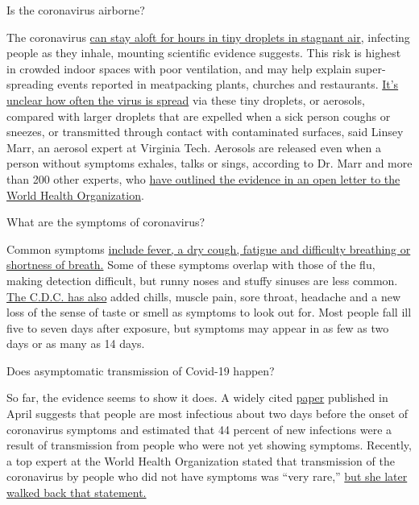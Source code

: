  Is the coronavirus airborne?

The coronavirus
\href{https://www.nytimes.com/2020/07/04/health/239-experts-with-one-big-claim-the-coronavirus-is-airborne.html}{can
stay aloft for hours in tiny droplets in stagnant air}, infecting people
as they inhale, mounting scientific evidence suggests. This risk is
highest in crowded indoor spaces with poor ventilation, and may help
explain super-spreading events reported in meatpacking plants, churches
and restaurants.
\href{https://www.nytimes.com/2020/07/06/health/coronavirus-airborne-aerosols.html}{It's
unclear how often the virus is spread} via these tiny droplets, or
aerosols, compared with larger droplets that are expelled when a sick
person coughs or sneezes, or transmitted through contact with
contaminated surfaces, said Linsey Marr, an aerosol expert at Virginia
Tech. Aerosols are released even when a person without symptoms exhales,
talks or sings, according to Dr. Marr and more than 200 other experts,
who
\href{https://academic.oup.com/cid/article/doi/10.1093/cid/ciaa939/5867798}{have
outlined the evidence in an open letter to the World Health
Organization}.

 What are the symptoms of coronavirus?

Common symptoms
\href{https://www.nytimes.com/article/symptoms-coronavirus.html}{include
fever, a dry cough, fatigue and difficulty breathing or shortness of
breath.} Some of these symptoms overlap with those of the flu, making
detection difficult, but runny noses and stuffy sinuses are less common.
\href{https://www.nytimes.com/2020/04/27/health/coronavirus-symptoms-cdc.html}{The
C.D.C. has also} added chills, muscle pain, sore throat, headache and a
new loss of the sense of taste or smell as symptoms to look out for.
Most people fall ill five to seven days after exposure, but symptoms may
appear in as few as two days or as many as 14 days.

 Does asymptomatic transmission of Covid-19 happen?

So far, the evidence seems to show it does. A widely cited
\href{https://www.nature.com/articles/s41591-020-0869-5}{paper}
published in April suggests that people are most infectious about two
days before the onset of coronavirus symptoms and estimated that 44
percent of new infections were a result of transmission from people who
were not yet showing symptoms. Recently, a top expert at the World
Health Organization stated that transmission of the coronavirus by
people who did not have symptoms was ``very rare,''
\href{https://www.nytimes.com/2020/06/09/world/coronavirus-updates.html\#link-1f302e21}{but
she later walked back that statement.}

